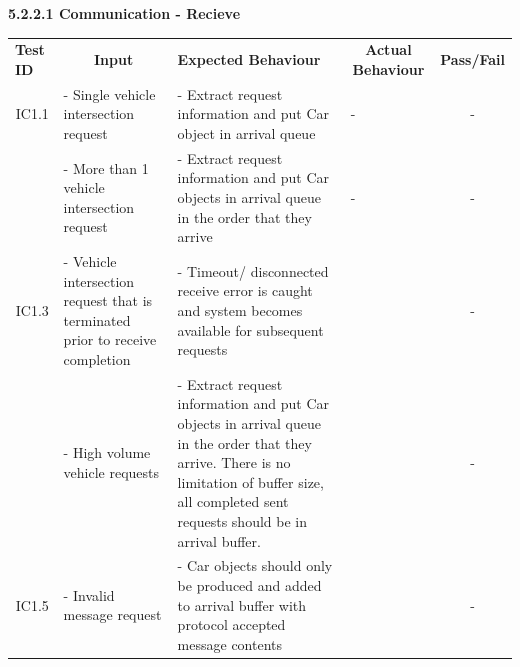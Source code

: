 \documentclass [10pt]{article}
\begin{document}
    
    \textbf{5.2.2.1 Communication - Recieve} \vspace{2mm}
 \begin{longtable}{ |p{ }  |   p{ } | p{ } | p{ } |  p{ } |}  \hline

    \rowcolor{subsectionC}\textbf{Test ID}
    & \multicolumn{1}{c|}{\textbf{Input} }
    & \textbf{Expected Behaviour} 
    & \multicolumn{1}{c|}{\textbf{Actual Behaviour} }
    & \multicolumn{1}{c|}{\textbf{Pass/Fail}} \\  
    
    \multicolumn{1}{|c|}{IC1.1} 
    & - Single vehicle intersection request 
    & - Extract request information and put Car object in arrival queue 
    & - 
    & \multicolumn{1}{c|}{-}\\ 
    
    \rowcolor{tableCell}\multicolumn{1}{|c|}{IC1.2} 
    & - More than 1 vehicle intersection request 
    & - Extract request information and put Car objects in arrival queue in the order that they arrive 
    & -
    & \multicolumn{1}{c|}{-}\\ 
    
    \multicolumn{1}{|c|}{IC1.3} 
    & - Vehicle intersection request that is terminated prior to receive completion
    & - Timeout/ disconnected receive error is caught and system becomes available for subsequent requests
    & 
    & \multicolumn{1}{c|}{-}\\ 
    
    \rowcolor{tableCell}\multicolumn{1}{|c|}{IC1.4} 
    & - High volume vehicle requests
    & - Extract request information and put Car objects in arrival queue in the order that they arrive. There is no limitation of buffer size, all completed sent requests should be in arrival buffer. 
    &  
    & \multicolumn{1}{c|}{-}\\ 
    
    \multicolumn{1}{|c|}{IC1.5} 
    & - Invalid message \newline request
    & - Car objects should only be produced and added to arrival buffer with protocol accepted message contents
    & 
    & \multicolumn{1}{c|}{-}\\ \hline

     
    \end{longtable}
    
\end{document}
